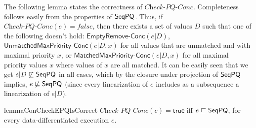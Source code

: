 %
%
%

The following lemma states the correctness of $\textit{Check-PQ-Conc}$. Completeness follows easily from the properties of $\mathsf{SeqPQ}$. Thus, if $\textit{Check-PQ-Conc}(e) = \textit{false}$, then there exists a set of values $D$ such that one of the following doesn't hold: $\mathsf{EmptyRemove\text{-}Conc}(e \vert D)$, {\color {blue}$\mathsf{UnmatchedMaxPriority\text{-}Conc}(e \vert D,x)$ for all values that are unmatched and with maximal priority $x$, or $\mathsf{MatchedMaxPriority\text{-}Conc}(e \vert D,x)$ for all maximal priority values $x$ where values of $x$ are all matched.} It can be easily seen that we get $e \vert D\not\sqsubseteq \mathsf{SeqPQ}$ in all cases, which by the closure under projection of $\mathsf{SeqPQ}$ implies, $e \not\sqsubseteq \mathsf{SeqPQ}$ (since every linearization of $e$ includes as a subsequence a linearization of $e \vert D$).

\begin{restatable}{lemma}{ConCheckEPQIsCorrect}
\label{lemma:con-check-EPQ is correct}
$\textit{Check-PQ-Conc}(e)=\mathsf{true}$ iff $e \sqsubseteq \mathsf{SeqPQ}$, for every data-differentiated execution $e$.
\end{restatable}


